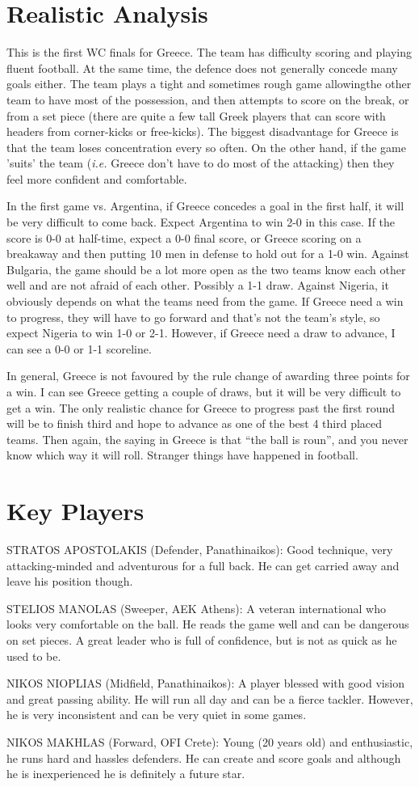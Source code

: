 \section{Realistic Analysis}
This is the first WC finals for Greece. The team has difficulty scoring and
playing fluent football. At the same time, the defence does not generally 
concede many goals either. The team plays a tight and sometimes rough game 
allowingthe other team to have  most of the possession, and then attempts to
score on the break, or from a set piece (there are quite a few tall Greek
players that can score with headers from corner-kicks or free-kicks). The 
biggest disadvantage for Greece is that the team loses concentration every
so often. On the other hand, if the game 'suits' the team (\textit{i.e.} Greece don't
have to do most of the attacking) then they feel more confident and comfortable.

In the first game vs. Argentina, if Greece concedes a goal in the first half,
it will be very difficult to come back. Expect Argentina to win 2-0 in this
case. If the score is 0-0 at half-time, expect a 0-0 final score, or Greece 
scoring on a breakaway and then putting 10 men in defense to hold out for a 1-0
win. Against Bulgaria, the game should be a lot more open as the two teams know
each other well and are not afraid of each other. Possibly a 1-1 draw. Against 
Nigeria, it obviously depends on what the teams need from the game. If Greece 
need a win to progress, they will have to go forward and that's not the team's 
style, so expect Nigeria to win 1-0 or 2-1. However, if Greece need a draw to 
advance, I can see a 0-0 or 1-1 scoreline.

In general, Greece is not favoured by the rule change of awarding three points
for a win. I can see Greece getting a couple of draws, but it will be very
difficult to get a win. The only realistic chance for Greece to progress past 
the first round will be to finish third and hope to advance as one of the best 
4 third placed teams. Then again, the saying in Greece is that ``the ball is 
roun'', and you never know which way it will roll. Stranger things have 
happened in football.
\section{Key Players}
STRATOS APOSTOLAKIS (Defender, Panathinaikos): 
Good technique, very attacking-minded and adventurous for a full back. He can 
get carried away and leave his position though.

STELIOS MANOLAS (Sweeper, AEK Athens): 
A veteran international who looks very comfortable on the ball. He reads the 
game well and can be dangerous on set pieces. A great leader who is full of
confidence, but is not as quick as he used to be.

NIKOS NIOPLIAS (Midfield, Panathinaikos): 
A player blessed with good vision and great passing ability. He will run all 
day and can be a fierce tackler. However, he is very inconsistent and can be
very quiet in some games.

NIKOS MAKHLAS (Forward, OFI Crete): 
Young (20 years old) and enthusiastic, he runs hard and hassles defenders. He 
can create and score goals and although he is inexperienced he is definitely a 
future star.
